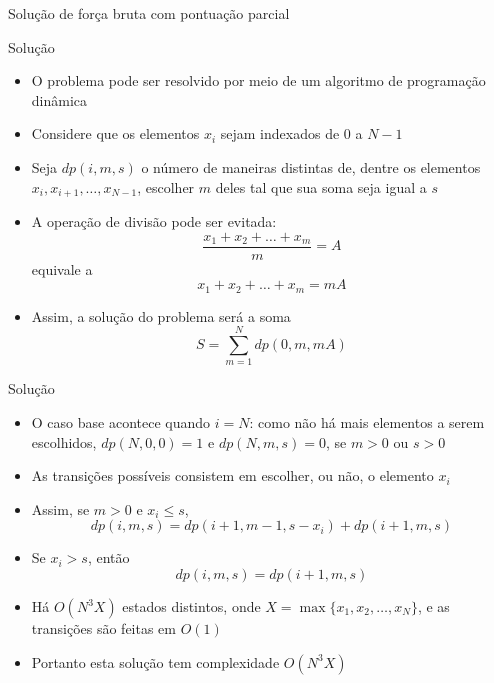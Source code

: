 \begin{frame}[fragile]{Solução de força bruta com pontuação parcial}
\end{frame}

\begin{frame}[fragile]{Solução}

    \begin{itemize}
        \item O problema pode ser resolvido por meio de um algoritmo de programação dinâmica

        \item Considere que os elementos $x_i$ sejam indexados de 0 a $N - 1$

        \item Seja $dp(i, m, s)$ o número de maneiras distintas de, dentre os elementos
            $x_i, x_{i + 1}, \ldots, x_{N - 1}$, escolher $m$ deles tal que sua soma
            seja igual a $s$

        \item A operação de divisão pode ser evitada:
        \[
            \frac{x_1 + x_2 + \ldots + x_m}{m} = A
        \]
        equivale a
        \[
            x_1 + x_2 + \ldots + x_m = mA
        \]

        \item Assim, a solução do problema será a soma
        \[
            S = \sum_{m = 1}^N dp(0, m, mA)
        \]
    \end{itemize}

\end{frame}


\begin{frame}[fragile]{Solução}

    \begin{itemize}
        \item O caso base acontece quando $i = N$: como não há mais elementos a serem escolhidos,
            $dp(N, 0, 0) = 1$ e $dp(N, m, s) = 0$, se $m > 0$ ou $s > 0$

        \item As transições possíveis consistem em escolher, ou não, o elemento $x_i$

        \item Assim, se $m > 0$ e $x_i \leq s$, 
        \[
            dp(i, m, s) = dp(i + 1, m - 1, s - x_i) + dp(i + 1, m, s)
        \]

        \item Se $x_i > s$, então
        \[
            dp(i, m, s) = dp(i + 1, m, s)
        \]

        \item Há $O(N^3X)$ estados distintos, onde $X = \max\{ x_1, x_2, \ldots, x_N \}$, e as
            transições são feitas em $O(1)$

        \item Portanto esta solução tem complexidade $O(N^3X)$
    \end{itemize}

\end{frame}


